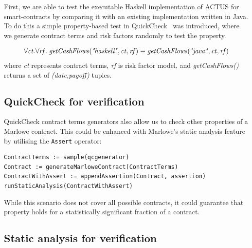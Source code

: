 \documentclass[runningheads]{llncs}
\newcommand{\ident}[1]{\mbox{\emph{#1}}}
\begin{document}
First, we are able to test the executable Haskell implementation
of ACTUS for smart-contracts by comparing it with an existing implementation written in Java. To do this  
a simple property-based test in QuickCheck~\cite{qc} was introduced, where we generate contract terms and risk factors randomly to test the property.

\newcommand{\rf}{\ident{rf}}
\newcommand{\ct}{\ident{ct}}
\smallskip
\noindent 
\begin{equation}
\forall \ct.\forall \rf. \; \ident{getCashFlows}(\ident{"haskell"},\ct,\rf)\equiv \ident{getCashFlows}(\ident{"java"},\ct,\rf)
\end{equation}
\noindent
where \emph{ct} represents contract terms, \emph{rf} is risk factor model, and
\emph{getCashFlows()} returns a set of \emph{(date,payoff)} tuples.

\subsection{QuickCheck for verification}

QuickCheck contract terms generators also allow us to check
other properties of a Marlowe contract. This could be enhanced
with Marlowe's static analysis feature by utilising the \texttt{Assert} operator:

\begin{verbatim}
ContractTerms := sample(qcgenerator) 
Contract := generateMarloweContract(ContractTerms) 
ContractWithAssert := appendAssertion(Contract, assertion) 
runStaticAnalysis(ContractWithAssert)
\end{verbatim}

While this scenario does not cover all possible contracts, it could guarantee that
property holds for a statistically significant fraction of a contract.

\subsection{Static analysis for verification}
\end{document}
